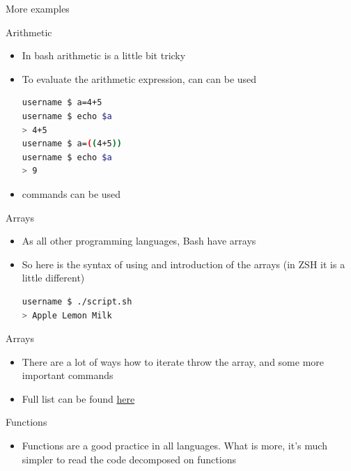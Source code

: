 \documentclass[usenames,dvipsnames,10pt,aspectratio=169]{beamer}
\begin{document}
\begin{frame}{More  examples}
    
\end{frame}

\begin{frame}[fragile]{Arithmetic}
    \begin{itemize}
        \item In bash arithmetic is a little bit tricky
        \item To evaluate the arithmetic expression,  can can be used
        \begin{lstlisting}[language=Bash, style=shellstyle]
username $ a=4+5
username $ echo $a
> 4+5
username $ a=((4+5))
username $ echo $a
> 9 \end{lstlisting}
        \item {} commands can be used 
    \end{itemize}
\end{frame}

\begin{frame}[fragile]{Arrays}
    \begin{itemize}
        \item As all other programming languages, Bash have arrays
        \item So here is the syntax of using and introduction of the arrays (in ZSH it is a little different)
        
        \begin{lstlisting}[language=Bash, style=shellstyle]
username $ ./script.sh
> Apple Lemon Milk
        \end{lstlisting}
    \end{itemize}
\end{frame}

\begin{frame}[fragile]{Arrays}
    \begin{itemize}
        \item There are a lot of ways how to iterate throw the array, and some more important commands
        
        \item Full list can be found \href{https://devhints.io/bash#arrays}{here}
    \end{itemize}
\end{frame}

\begin{frame}[fragile]{Functions}
    \begin{itemize}
        \item Functions are a good practice in all languages. What is more, it's much simpler to read the code decomposed on functions
        
    \end{itemize}
\end{frame}
\end{document}
